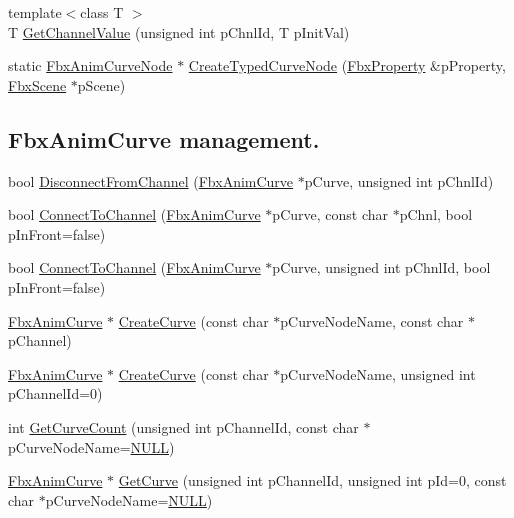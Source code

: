 \begin{DoxyCompactItemize}
\item 
{\footnotesize template$<$class T $>$ }\\T \hyperlink{class_fbx_anim_curve_node_a1fb96d04b8c53ec130c5be376b923c6c}{Get\+Channel\+Value} (unsigned int p\+Chnl\+Id, T p\+Init\+Val)
\item 
static \hyperlink{class_fbx_anim_curve_node}{Fbx\+Anim\+Curve\+Node} $\ast$ \hyperlink{class_fbx_anim_curve_node_a588814e5973e080f84c54438623ddf7e}{Create\+Typed\+Curve\+Node} (\hyperlink{class_fbx_property}{Fbx\+Property} \&p\+Property, \hyperlink{class_fbx_scene}{Fbx\+Scene} $\ast$p\+Scene)
\end{DoxyCompactItemize}
\subsection*{Fbx\+Anim\+Curve management.}
\begin{DoxyCompactItemize}
\item 
bool \hyperlink{class_fbx_anim_curve_node_a76db258a1f1d7c2a4a178c00788c7a92}{Disconnect\+From\+Channel} (\hyperlink{class_fbx_anim_curve}{Fbx\+Anim\+Curve} $\ast$p\+Curve, unsigned int p\+Chnl\+Id)
\item 
bool \hyperlink{class_fbx_anim_curve_node_a29ef7927112552fcbacd6a82555e15e4}{Connect\+To\+Channel} (\hyperlink{class_fbx_anim_curve}{Fbx\+Anim\+Curve} $\ast$p\+Curve, const char $\ast$p\+Chnl, bool p\+In\+Front=false)
\item 
bool \hyperlink{class_fbx_anim_curve_node_a33b04e03a4e6c965963ffc0e4abc9608}{Connect\+To\+Channel} (\hyperlink{class_fbx_anim_curve}{Fbx\+Anim\+Curve} $\ast$p\+Curve, unsigned int p\+Chnl\+Id, bool p\+In\+Front=false)
\item 
\hyperlink{class_fbx_anim_curve}{Fbx\+Anim\+Curve} $\ast$ \hyperlink{class_fbx_anim_curve_node_af3600f3846c38a82b0ea6491c9b2857f}{Create\+Curve} (const char $\ast$p\+Curve\+Node\+Name, const char $\ast$p\+Channel)
\item 
\hyperlink{class_fbx_anim_curve}{Fbx\+Anim\+Curve} $\ast$ \hyperlink{class_fbx_anim_curve_node_a10fa606f04216696240ad9d1cc655985}{Create\+Curve} (const char $\ast$p\+Curve\+Node\+Name, unsigned int p\+Channel\+Id=0)
\item 
int \hyperlink{class_fbx_anim_curve_node_a41d28a650fa90706d1c67ad5f56530b5}{Get\+Curve\+Count} (unsigned int p\+Channel\+Id, const char $\ast$p\+Curve\+Node\+Name=\hyperlink{fbxarch_8h_a070d2ce7b6bb7e5c05602aa8c308d0c4}{N\+U\+LL})
\item 
\hyperlink{class_fbx_anim_curve}{Fbx\+Anim\+Curve} $\ast$ \hyperlink{class_fbx_anim_curve_node_a818b6198c31818e863d3d5bc7948c2e2}{Get\+Curve} (unsigned int p\+Channel\+Id, unsigned int p\+Id=0, const char $\ast$p\+Curve\+Node\+Name=\hyperlink{fbxarch_8h_a070d2ce7b6bb7e5c05602aa8c308d0c4}{N\+U\+LL})
\end{DoxyCompactItemize}
